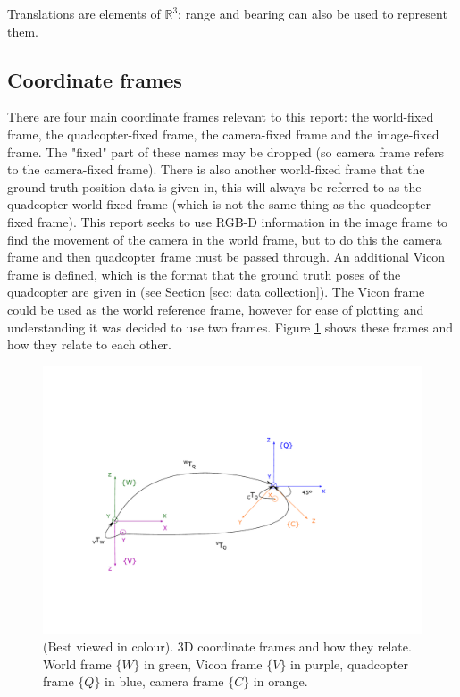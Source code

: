 \documentclass[12pt,a4paper]{article}
\begin{document}
    Translations are elements of $\mathbb{R}^3$; range and bearing can also be used to represent them.



  \subsection{Coordinate frames}
    \label{ssec: BI coord}
    There are four main coordinate frames relevant to this report: the world-fixed frame, the quadcopter-fixed frame, the camera-fixed frame and the image-fixed frame. The "fixed" part of these names may be dropped (so camera frame refers to the camera-fixed frame). There is also another world-fixed frame that the ground truth position data is given in, this will always be referred to as the quadcopter world-fixed frame (which is not the same thing as the quadcopter-fixed frame). This report seeks to use RGB-D information in the image frame to find the movement of the camera in the world frame, but to do this the camera frame and then quadcopter frame must be passed through. An additional Vicon frame is defined, which is the format that the ground truth poses of the quadcopter are given in (see Section \ref{sec: data collection}). The Vicon frame could be used as the world reference frame, however for ease of plotting and understanding it was decided to use two frames. Figure \ref{f: frames} shows these frames and how they relate to each other. 

    \begin{figure}[b!]
      \centering
        \includegraphics[width=120mm, trim = 30mm 40mm 70mm 50mm, clip]{frames/frames_env.pdf}
      \caption{(Best viewed in colour). 3D coordinate frames and how they relate. World frame $\{W\}$ in green, Vicon frame $\{V\}$ in purple, quadcopter frame $\{Q\}$ in blue, camera frame $\{C\}$ in orange.}
      \label{f: frames}
    \end{figure}
\end{document}
